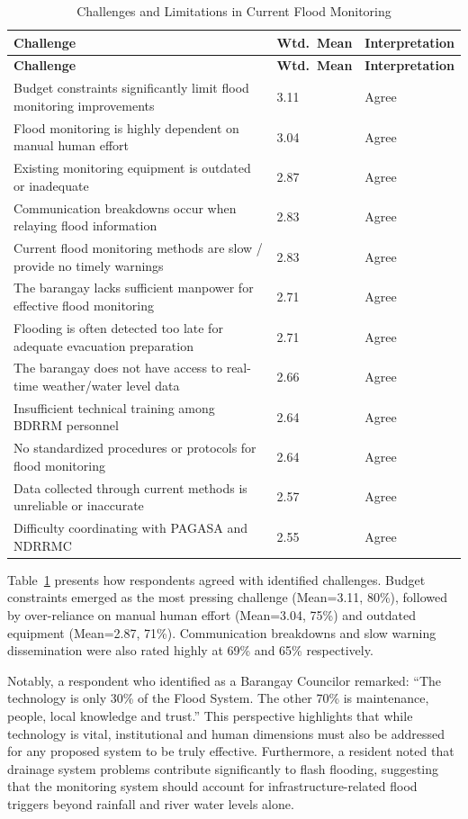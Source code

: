 \documentclass{research}
\begin{document}
\begin{longtable}{p{10cm}|p{1.4cm}|p{3cm}}
\caption{Challenges and Limitations in Current Flood Monitoring}
\label{tab:challenges} \\
\hline
\textbf{Challenge} & \textbf{Wtd.\ Mean} & \textbf{Interpretation} \\
\hline
\endfirsthead
\hline
\textbf{Challenge} & \textbf{Wtd.\ Mean} & \textbf{Interpretation} \\
\hline
\endhead
\hline
\endfoot
Budget constraints significantly limit flood monitoring improvements
  & 3.11 & Agree \\[3pt]
Flood monitoring is highly dependent on manual human effort
  & 3.04 & Agree \\[3pt]
Existing monitoring equipment is outdated or inadequate
  & 2.87 & Agree \\[3pt]
Communication breakdowns occur when relaying flood information
  & 2.83 & Agree \\[3pt]
Current flood monitoring methods are slow / provide no timely warnings
  & 2.83 & Agree \\[3pt]
The barangay lacks sufficient manpower for effective flood monitoring
  & 2.71 & Agree \\[3pt]
Flooding is often detected too late for adequate evacuation preparation
  & 2.71 & Agree \\[3pt]
The barangay does not have access to real-time weather/water level data
  & 2.66 & Agree \\[3pt]
Insufficient technical training among BDRRM personnel
  & 2.64 & Agree \\[3pt]
No standardized procedures or protocols for flood monitoring
  & 2.64 & Agree \\[3pt]
Data collected through current methods is unreliable or inaccurate
  & 2.57 & Agree \\[3pt]
Difficulty coordinating with PAGASA and NDRRMC
  & 2.55 & Agree \\
\hline
\end{longtable}
 
Table~\ref{tab:challenges} presents how respondents agreed with identified challenges.
Budget constraints emerged as the most pressing challenge (Mean=3.11, 80\%),
followed by over-reliance on manual human effort (Mean=3.04, 75\%) and outdated
equipment (Mean=2.87, 71\%). Communication breakdowns and slow warning
dissemination were also rated highly at 69\% and 65\% respectively.
 
Notably, a respondent who identified as a Barangay Councilor remarked: ``The
technology is only 30\% of the Flood System. The other 70\% is maintenance, people,
local knowledge and trust.'' This perspective highlights that while technology is vital,
institutional and human dimensions must also be addressed for any proposed system
to be truly effective. Furthermore, a resident noted that drainage system problems
contribute significantly to flash flooding, suggesting that the monitoring system should
account for infrastructure-related flood triggers beyond rainfall and river water levels
alone.
 
\end{document}
